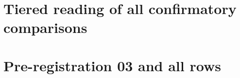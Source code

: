 \section{Tiered reading of all confirmatory comparisons}

\section{Pre-registration 03 and all rows}

